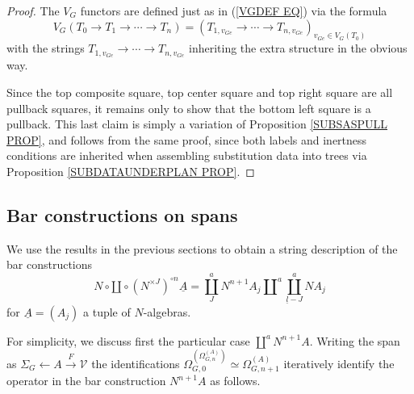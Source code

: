 \documentclass[a4paper,10pt]{article}%
\begin{document}
\begin{proof}
	The $V_G$ functors are defined just as in (\ref{VGDEF EQ}) via the formula
	\[
	V_G(T_0 \to T_1 \to \cdots \to T_n) = 
	(T_{1,v_{Ge}} \to \cdots \to
	T_{n,v_{Ge}})_{v_{Ge} \in V_G(T_0)}\]
with the strings 
$T_{1,v_{Ge}} \to \cdots \to T_{n,v_{Ge}}$
inheriting the extra structure in the obvious way.

Since the top composite square, top center square and top right square are all pullback squares, it remains only to show that the bottom left square is a pullback.
This last claim is simply a variation of Proposition \ref{SUBSASPULL PROP}, and follows from the same proof, since both labels and inertness conditions are inherited when assembling substitution data into trees via Proposition \ref{SUBDATAUNDERPLAN PROP}.
\end{proof}


\subsection{Bar constructions on spans}

We use the results in the previous sections to obtain a string description of the bar constructions
\[
N \circ \amalg \circ (N^{\times J})^{\circ n} \underline{A} = 
\coprod_J^a N^{n +1} A_j \amalg^a
\coprod_{\underline{l}-J}^a N A_j
\]
for $\underline{A} = \left(A_j \right)$ a tuple of $N$-algebras.

For simplicity, we discuss first the particular case 
$\coprod^a N^{n+1} A$. Writing the span as 
$\Sigma_G \leftarrow A \xrightarrow{F} \mathcal{V}$
the identifications 
$\Omega_{G,0}^{\left( \Omega_{G,n}^{(A)} \right)} \simeq \Omega_{G,n+1}^{(A)}$
iteratively identify the operator in the bar construction
$N^{n+1} A$ as follows.
\end{document}
